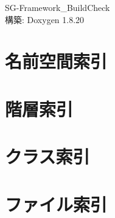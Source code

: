 \let\mypdfximage\pdfximage\def\pdfximage{\immediate\mypdfximage}\documentclass[twoside]{book}
\newcommand{\+}{\discretionary{\mbox{\scriptsize$\hookleftarrow$}}{}{}}
\newcommand{\clearemptydoublepage}{%
  \newpage{\pagestyle{empty}\cleardoublepage}%
}
\begin{document}
\begin{CJK}{UTF8}{min}

\hypersetup{pageanchor=false,
             bookmarksnumbered=true,
             pdfencoding=unicode
            }
\begin{titlepage}
\vspace*{7cm}
\begin{center}%
{\Large S\+G-\/\+Framework\+\_\+\+Build\+Check }\\
\vspace*{1cm}
{\large 構築\+: Doxygen 1.8.20}\\
\end{center}
\end{titlepage}
\clearemptydoublepage
{}
\tableofcontents
\clearemptydoublepage
{}
\hypersetup{pageanchor=true}

\chapter{名前空間索引}

\chapter{階層索引}

\chapter{クラス索引}

\chapter{ファイル索引}


\end{CJK}
\end{document}

